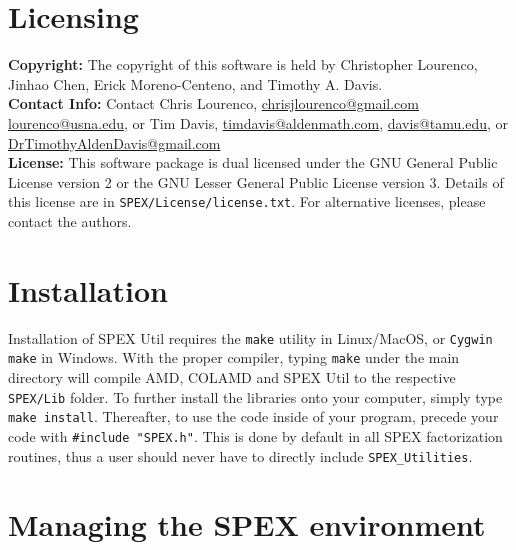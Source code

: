 \documentclass[12pt]{report}
\theoremstyle{definition}
\begin{document}
\section{Licensing} \label{s:util:licensing}

\textbf{Copyright:} The copyright of this software is held by Christopher Lourenco, Jinhao Chen, Erick Moreno-Centeno, and Timothy A. Davis.\\

\noindent \textbf{Contact Info:} Contact Chris Lourenco,
\href{mailto:chrisjlourenco@gmail.com}{chrisjlourenco@gmail.com} \href{mailto:lourenco@usna.edu}{lourenco@usna.edu}, or Tim Davis,
\href{mailto:timdavis@aldenmath.com}{timdavis@aldenmath.com},
\href{mailto:davis@tamu.edu}{davis@tamu.edu}, or
\href{DrTimothyAldenDavis@gmail.com}{DrTimothyAldenDavis@gmail.com}\\

\noindent \textbf{License:} This software package is dual licensed under the GNU General Public License version 2 or the GNU Lesser General Public License version 3. Details of this license are in \verb|SPEX/License/license.txt|. For alternative licenses, please contact the authors.


\section{Installation} \label{s:util:install}

Installation of SPEX Util requires the \verb|make| utility in Linux/MacOS, or
\verb|Cygwin make| in Windows. With the proper compiler, typing \verb|make|
under the main directory will compile AMD, COLAMD and SPEX Util to the respective
\verb|SPEX/Lib| folder. To further install the libraries onto your computer,
simply type \verb|make install|.  Thereafter, to use the code inside of your
program, precede your code with \newline \verb|#include "SPEX.h"|. This is done
by default in all SPEX factorization routines, thus a user should never have to
directly include \verb|SPEX_Utilities|.

\section{Managing the SPEX environment} \label{s:user:setup}
\end{document}
